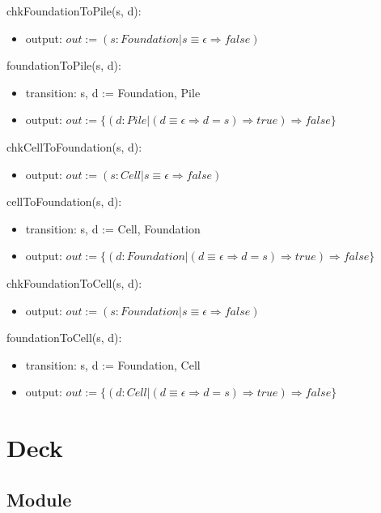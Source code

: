 \documentclass[12pt,fleqn]{article}
\begin{document}
\noindent chkFoundationToPile(s, d):
\begin{itemize}
\item output: $out := (s:Foundation | s \equiv \epsilon \Rightarrow false)$
\end{itemize}


\noindent foundationToPile(s, d):
\begin{itemize}
\item transition: s, d := Foundation, Pile
\item output: $out := \{(d: Pile| (d \equiv \epsilon \Rightarrow d = s)\Rightarrow true) \Rightarrow false\}$
\end{itemize}

\noindent chkCellToFoundation(s, d):
\begin{itemize}
\item output: $out := (s:Cell | s \equiv \epsilon \Rightarrow false)$
\end{itemize}


\noindent cellToFoundation(s, d):
\begin{itemize}
\item transition: s, d := Cell, Foundation
\item output: $out := \{(d: Foundation| (d \equiv \epsilon \Rightarrow d = s)\Rightarrow true) \Rightarrow false\}$
\end{itemize}


\noindent chkFoundationToCell(s, d):
\begin{itemize}
\item output: $out := (s:Foundation | s \equiv \epsilon \Rightarrow false)$
\end{itemize}

\noindent foundationToCell(s, d):
\begin{itemize}
\item transition: s, d := Foundation, Cell
\item output: $out := \{(d: Cell| (d \equiv \epsilon \Rightarrow d = s)\Rightarrow true) \Rightarrow false\}$
\end{itemize}


\section* {Deck}

\subsection* {Module}
\end{document}

